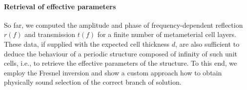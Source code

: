 \paragraph{Retrieval of effective parameters} %
So far, we computed the amplitude and phase of frequency-dependent reflection $r(f)$ and transmission $t(f)$ for a finite number of metameterial cell layers. 
These data, if supplied with the expected cell thickness $d$, are also sufficient to deduce the behaviour of a periodic structure composed of infinity of such unit cells, i.e., to retrieve the effective parameters of the structure. %
To this end, we employ the Fresnel inversion and show a custom approach how to obtain physically sound selection of the correct branch of solution.

